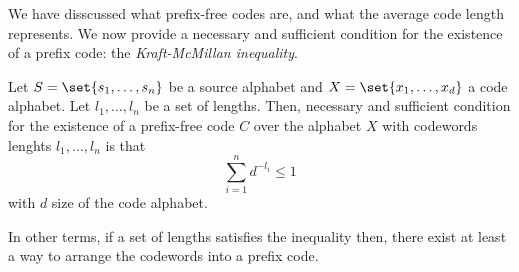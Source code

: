 \documentclass{subfiles}
\begin{document}
    We have disscussed what prefix-free codes are, 
        and what the average code length represents.
    We now provide a necessary and sufficient condition for the existence of 
    a prefix code: the \emph{Kraft-McMillan inequality}.
    \begin{theorem}\label{Thm:2}
        Let \(S = \set{s_{1}, \ldots, s_{n}}\) be a source alphabet
        and \(X =\set{x_{1}, \ldots, x_{d}}\) a code alphabet.
        Let \(l_{1}, \ldots, l_{n}\) be a set of lengths.
        Then, necessary and sufficient condition for the existence of a 
        prefix-free code \(C\) over the alphabet \(X\) with codewords lenghts 
        \(l_{1}, \ldots, l_{n}\) is that 
        \[
            \sum_{i = 1}^{n}{d^{-l_{i}}} \le 1
        \]
        with \(d\) size of the code alphabet.
    \end{theorem}
    In other terms, if a set of lengths satisfies the inequality then,
        there exist at least a way to arrange the codewords into a prefix code.
\end{document}
